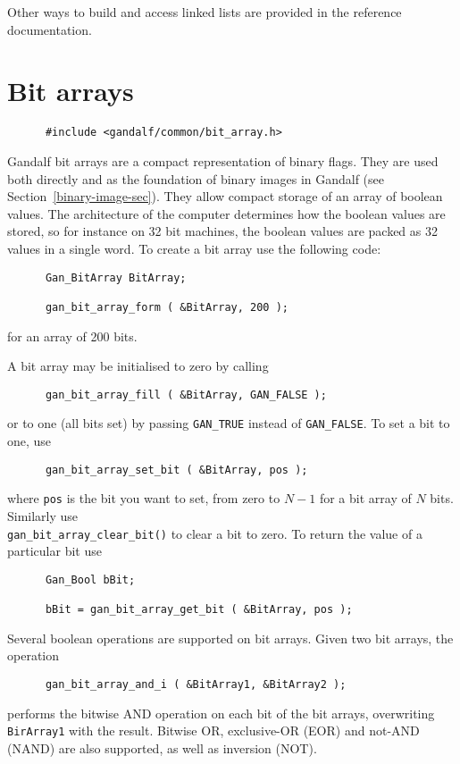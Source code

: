 Other ways to build and access linked lists are provided in the reference
documentation.

\section{Bit arrays} \label{bit-array-sec}
\begin{verbatim}
      #include <gandalf/common/bit_array.h>
\end{verbatim}
Gandalf bit arrays are a compact representation of binary flags.
They are used both directly and as the foundation of binary images in Gandalf
(see Section~\ref{binary-image-sec}).
They allow compact storage of an array of boolean values.
The architecture of the computer determines how the boolean values are stored,
so for instance on 32 bit machines, the boolean values are packed as 32 values
in a single word.
To create a bit array use the following code:
\begin{verbatim}
      Gan_BitArray BitArray;

      gan_bit_array_form ( &BitArray, 200 );
\end{verbatim}
for an array of 200 bits.

A bit array may be initialised to zero by calling
\begin{verbatim}
      gan_bit_array_fill ( &BitArray, GAN_FALSE );
\end{verbatim}
or to one (all bits set) by passing {\tt GAN\_TRUE} instead of
{\tt GAN\_FALSE}. To set a bit to one, use
\begin{verbatim}
      gan_bit_array_set_bit ( &BitArray, pos );
\end{verbatim}
where {\tt pos} is the bit you want to set, from zero to $N-1$ for a bit
array of $N$ bits. Similarly use\\ {\tt gan\_bit\_array\_clear\_bit()} to
clear a bit to zero. To return the value of a particular bit use
\begin{verbatim}
      Gan_Bool bBit;

      bBit = gan_bit_array_get_bit ( &BitArray, pos );
\end{verbatim}

Several boolean operations are supported on bit arrays. Given two bit arrays,
the operation
\begin{verbatim}
      gan_bit_array_and_i ( &BitArray1, &BitArray2 );
\end{verbatim}
performs the bitwise AND operation on each bit of the bit arrays, overwriting
{\tt BirArray1} with the result. Bitwise OR, exclusive-OR (EOR) and not-AND
(NAND) are also supported, as well as inversion (NOT).

